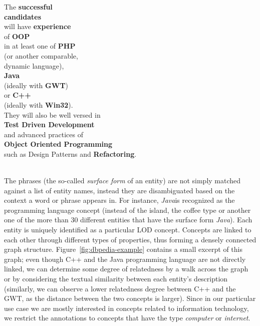 \documentclass[conference]{IEEEtran}
\begin{document}
\vspace{1em}
{\small

\noindent The \textbf{successful} \\
\textbf{candidates}  \\
will have \textbf{experience} \\
of \textbf{OOP} \\
in at least one of \textbf{PHP} \\
(or another comparable,\\
dynamic language), \\
\textbf{Java} \\
(ideally with \textbf{GWT}) \\
or \textbf{C++} \\
(ideally with \textbf{Win32}). \\
They will also be well versed in\\
\textbf{Test Driven Development} \\
and advanced practices of\\
{\footnotesize\textbf{Object Oriented Programming}}  \\
such as Design Patterns and \textbf{Refactoring}. }\\

The
phrases (the so-called \emph{surface form} of an entity) are not simply matched
against a list of entity names, instead they are disambiguated based on the
context a word or phrase appears in. For instance, \emph{Java}is recognized as
the programming language concept (instead of the island, the coffee type or
another one of the more than 30 different entities that have the surface form
\emph{Java}). Each entity is uniquely identified as a particular LOD concept.
Concepts are linked to each other through different types
of properties, thus forming a densely connected graph structure.
Figure~\ref{fig:dbpedia-example} contains a small excerpt of this graph; even
though C++ and the Java programming language are not directly linked, we can
determine some degree of relatedness by a walk across the graph or by considering the textual similarity between each entity's description~\cite{gabrilovich2007computing} (similarly, we
can observe a lower relatedness degree between C++ and the GWT, as the distance
between the two concepts is larger). Since in our particular use
case we are mostly interested in concepts related to information technology, we
restrict the annotations to concepts that have the type \emph{computer} or
\emph{internet}.
\end{document}
